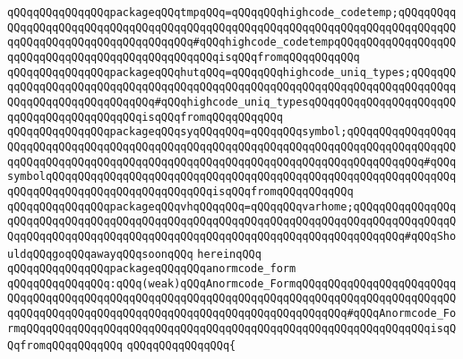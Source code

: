 \verb|qQQqqQQqqQQqqQQqpackageqQQqtmpqQQq=qQQqqQQqhighcode_codetemp;qQQqqQQqqQQqqQQqqQQqqQQqqQQqqQQqqQQqqQQqqQQqqQQqqQQqqQQqqQQqqQQqqQQqqQQqqQQqqQQqqQQqqQQqqQQqqQQqqQQqqQQqqQQq#qQQqhighcode_codetempqQQqqQQqqQQqqQQqqQQqqQQqqQQqqQQqqQQqqQQqqQQqqQQqqQQqisqQQqfromqQQqqQQqqQQq|\newline
\verb|qQQqqQQqqQQqqQQqpackageqQQqhutqQQq=qQQqqQQqhighcode_uniq_types;qQQqqQQqqQQqqQQqqQQqqQQqqQQqqQQqqQQqqQQqqQQqqQQqqQQqqQQqqQQqqQQqqQQqqQQqqQQqqQQqqQQqqQQqqQQqqQQqqQQq#qQQqhighcode_uniq_typesqQQqqQQqqQQqqQQqqQQqqQQqqQQqqQQqqQQqqQQqqQQqisqQQqfromqQQqqQQqqQQq|\newline
\verb|qQQqqQQqqQQqqQQqpackageqQQqsyqQQqqQQq=qQQqqQQqsymbol;qQQqqQQqqQQqqQQqqQQqqQQqqQQqqQQqqQQqqQQqqQQqqQQqqQQqqQQqqQQqqQQqqQQqqQQqqQQqqQQqqQQqqQQqqQQqqQQqqQQqqQQqqQQqqQQqqQQqqQQqqQQqqQQqqQQqqQQqqQQqqQQqqQQqqQQq#qQQqsymbolqQQqqQQqqQQqqQQqqQQqqQQqqQQqqQQqqQQqqQQqqQQqqQQqqQQqqQQqqQQqqQQqqQQqqQQqqQQqqQQqqQQqqQQqqQQqqQQqisqQQqfromqQQqqQQqqQQq|\newline
\verb|qQQqqQQqqQQqqQQqpackageqQQqvhqQQqqQQq=qQQqqQQqvarhome;qQQqqQQqqQQqqQQqqQQqqQQqqQQqqQQqqQQqqQQqqQQqqQQqqQQqqQQqqQQqqQQqqQQqqQQqqQQqqQQqqQQqqQQqqQQqqQQqqQQqqQQqqQQqqQQqqQQqqQQqqQQqqQQqqQQqqQQqqQQqqQQqqQQq#qQQqShouldqQQqgoqQQqawayqQQqsoonqQQq|\newline
\verb|hereinqQQq|\newline
\newline
\verb|qQQqqQQqqQQqqQQqpackageqQQqqQQqanormcode_form|\newline
\verb|qQQqqQQqqQQqqQQq:qQQq(weak)qQQqAnormcode_FormqQQqqQQqqQQqqQQqqQQqqQQqqQQqqQQqqQQqqQQqqQQqqQQqqQQqqQQqqQQqqQQqqQQqqQQqqQQqqQQqqQQqqQQqqQQqqQQqqQQqqQQqqQQqqQQqqQQqqQQqqQQqqQQqqQQqqQQqqQQqqQQqqQQq#qQQqAnormcode_FormqQQqqQQqqQQqqQQqqQQqqQQqqQQqqQQqqQQqqQQqqQQqqQQqqQQqqQQqqQQqqQQqisqQQqfromqQQqqQQqqQQq|\newline
\verb|qQQqqQQqqQQqqQQq{|\newline
\newline
\newline
\newline
